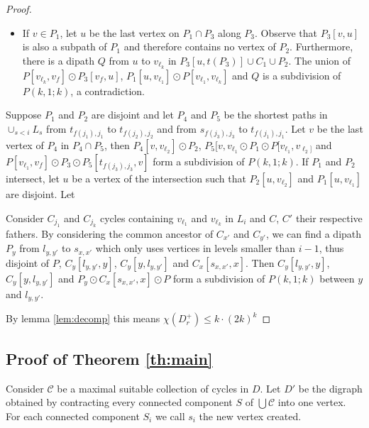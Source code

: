 \documentclass[utf8,10pt]{article}
\theoremstyle{plain}
\theoremstyle{definition}
\theoremstyle{remark}
\newcommand{\dr}{ k \cdot (2k)^k}
\begin{document}
\begin{proof}
\begin{itemize}
\begin{itemize}
	\item If $v\in P_1$, let $u$ be the last vertex on $P_1\cap P_3$ along $P_3$.  Observe that $P_3[v,u]$ is also a subpath of $P_1$ and therefore contains no vertex of $P_2$. Furthermore, there is a dipath $Q$ from $u$ to $v_{\ell_k}$ in $P_3[u, t(P_3)]\cup C_1\cup  P_2$.
	The union of $P[v_{\ell_k}, v_f] \odot P_3[v_f,u]$, $P_1[u, v_{\ell_1}]\odot P[v_{\ell_1}, v_{\ell_k}]$ and $Q$ is a subdivision of $P(k,1;k)$, a contradiction.

	\end{itemize}

\end{itemize}









Suppose $P_1$ and $P_2$ are disjoint and let $P_4$ and $P_5$ be the shortest paths in $\cup_{s < i} L_s$ 
from $t_{f(j_1),j_1}$ to $t_{f(j_2),j_2}$
and from $s_{f(j_3),j_3}$ to $t_{f(j_1),j_1}$. Let $v$ be the last vertex of $P_4$ in $P_4 \cap P_5$, then $P_4[v,v_{\ell_2}] \odot P_2$,
$P_5[v, v_{\ell_1} \odot P_1 \odot P[v_{\ell_1}, v_{\ell_2]}$ and $P[v_{\ell_1}, v_f] \odot P_3 \odot P_5[t_{f(j_3),j_3}, v]$
form a subdivision of $P(k,1;k)$.
If $P_1$ and $P_2$ intersect, let $u$ be a vertex of the intersection such that $P_2[u, v_{\ell_2}]$ and $P_1[u, v_{\ell_1}]$ are disjoint.
Let%



Consider $C_{j_1}$ and $C_{j_k}$ cycles containing $v_{\ell_1}$ and $v_{\ell_k}$ in $L_i$ and $C$, $C'$ their respective fathers. 
By considering the common ancestor of $C_{x'}$ and $C_{y'}$, we can find a dipath $P_y$ from $l_{y,y'}$ to $s_{x,x'}$ which 
only uses vertices in levels smaller than $i-1$, thus disjoint of $P$, $C_y[l_{y,y'}, y]$, $C_y[y, l_{y,y'}]$ and $C_x[s_{x,x'}, x]$. 
Then $C_y[l_{y,y'}, y]$, $C_y[y, l_{y,y'}]$ and $P_y \odot C_x[s_{x,x'}, x] \odot P$ form a subdivision of $P(k,1;k)$ between $y$ 
and $l_{y,y'}$. 

By lemma \ref{lem:decomp} this means $\chi(D_r^+) \leq  \dr$ 

\end{proof}

\subsection{Proof of Theorem \ref{th:main}}

Consider $\mathcal{C}$ be a maximal suitable collection of cycles in $D$. Let $D'$ be the digraph obtained by contracting 
every connected component $S$ of $\bigcup \mathcal{C}$ into one vertex. For each connected component $S_i$ we call $s_i$ the
new vertex created.
\end{document}
